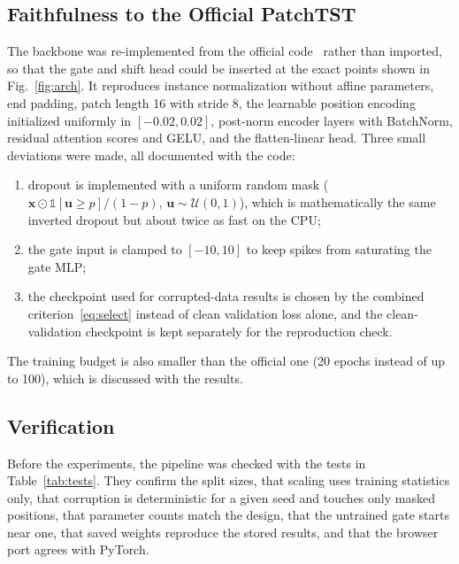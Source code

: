 \subsection{Faithfulness to the Official PatchTST}

The backbone was re-implemented from the official code~\cite{patchtst_code} rather than imported, so that the gate and shift head could be inserted at the exact points shown in Fig.~\ref{fig:arch}. It reproduces instance normalization without affine parameters, end padding, patch length 16 with stride 8, the learnable position encoding initialized uniformly in $[-0.02,0.02]$, post-norm encoder layers with BatchNorm, residual attention scores and GELU, and the flatten-linear head. Three small deviations were made, all documented with the code:
\begin{enumerate}
\item dropout is implemented with a uniform random mask ($\mathbf{x}\odot\mathbb{1}[\mathbf{u}\ge p]/(1-p)$, $\mathbf{u}\sim\mathcal{U}(0,1)$), which is mathematically the same inverted dropout but about twice as fast on the CPU;
\item the gate input is clamped to $[-10,10]$ to keep spikes from saturating the gate MLP;
\item the checkpoint used for corrupted-data results is chosen by the combined criterion~\eqref{eq:select} instead of clean validation loss alone, and the clean-validation checkpoint is kept separately for the reproduction check.
\end{enumerate}
The training budget is also smaller than the official one (20 epochs instead of up to 100), which is discussed with the results.

\subsection{Verification}

Before the experiments, the pipeline was checked with the tests in Table~\ref{tab:tests}. They confirm the split sizes, that scaling uses training statistics only, that corruption is deterministic for a given seed and touches only masked positions, that parameter counts match the design, that the untrained gate starts near one, that saved weights reproduce the stored results, and that the browser port agrees with PyTorch.

